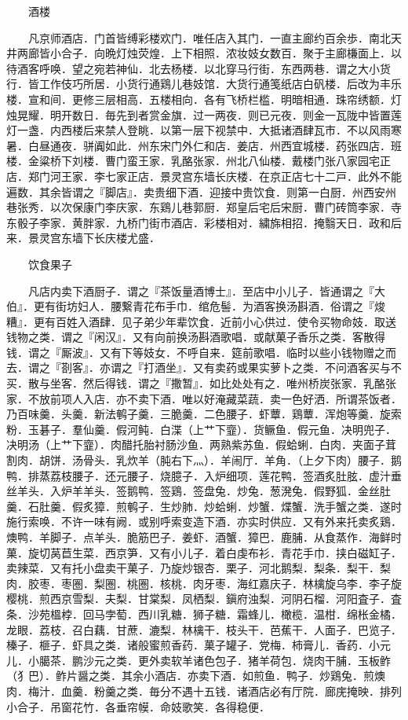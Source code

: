 　　酒楼

　　凡京师酒店．门首皆缚彩楼欢门．唯任店入其门．一直主廊约百余歩．南北天井两廊皆小合子．向晩灯烛荧煌．上下相照．浓妆妓女数百．聚于主廊槏面上．以待酒客呼唤．望之宛若神仙．北去杨楼．以北穿马行街．东西两巷．谓之大小货行．皆工作伎巧所居．小货行通鶏儿巷妓馆．大货行通笺纸店白矾楼．后改为丰乐楼．宣和间．更修三层相高．五楼相向．各有飞桥栏槛．明暗相通．珠帘绣额．灯烛晃耀．明开数日．毎先到者赏金旗．过一两夜．则已元夜．则金一瓦陇中皆置莲灯一盏．内西楼后来禁人登眺．以第一层下视禁中．大抵诸酒肆瓦市．不以风雨寒暑．白昼通夜．骈阗如此．州东宋门外仁和店．姜店．州西宜城楼．药张四店．班楼．金粱桥下刘楼．曹门蛮王家．乳酪张家．州北八仙楼．戴楼门张八家园宅正店．郑门河王家．李七家正店．景灵宫东墙长庆楼．在京正店七十二戸．此外不能遍数．其余皆谓之『脚店』．卖贵细下酒．迎接中贵饮食．则第一白厨．州西安州巷张秀．以次保康门李庆家．东鶏儿巷郭厨．郑皇后宅后宋厨．曹门砖筒李家．寺东骰子李家．黄胖家．九桥门街市酒店．彩楼相对．繍旆相招．掩翳天日．政和后来．景灵宫东墙下长庆楼尤盛．

　　饮食果子

　　凡店内卖下酒厨子．谓之『茶饭量酒博士』．至店中小儿子．皆通谓之『大伯』．更有街坊妇人．腰繋青花布手巾．绾危髻．为酒客换汤斟酒．俗谓之『焌糟』．更有百姓入酒肆．见子弟少年辈饮食．近前小心供过．使令买物命妓．取送钱物之类．谓之『闲汉』．又有向前换汤斟酒歌唱．或献菓子香乐之类．客散得钱．谓之『厮波』．又有下等妓女．不呼自来．筵前歌唱．临时以些小钱物赠之而去．谓之『剳客』．亦谓之『打酒坐』．又有卖药或果实萝卜之类．不问酒客买与不买．散与坐客．然后得钱．谓之『撒暂』．如比处处有之．唯州桥炭张家．乳酪张家．不放前项人入店．亦不卖下酒．唯以好淹藏菜蔬．卖一色好洒．所谓茶饭者．乃百味羹．头羹．新法鹌子羹．三脆羹．二色腰子．虾蕈．鶏蕈．浑炮等羹．旋索粉．玉碁子．羣仙羹．假河鲀．白渫（上艹下韲）．货鳜鱼．假元鱼．决明兜子．决明汤（上艹下韲）．肉醋托胎衬肠沙鱼．两熟紫苏鱼．假蛤蜊．白肉．夹面子茸割肉．胡饼．汤骨头．乳炊羊（肫右下灬）．羊闹厅．羊角．（上夕下肉）腰子．鹅鸭．排蒸荔枝腰子．还元腰子．烧臆子．入炉细项．莲花鸭．签酒炙肚胘．虚汁垂丝羊头．入炉羊羊头．签鹅鸭．签鶏．签盘兔．炒兔．葱溌兔．假野狐．金丝肚羹．石肚羹．假炙獐．煎鹌子．生炒肺．炒蛤蜊．炒蟹．煠蟹．洗手蟹之类．遂时施行索唤．不许一味有阙．或别呼索变造下酒．亦实时供应．又有外来托卖炙鶏．燠鸭．羊脚子．点羊头．脆筋巴子．姜虾．酒蟹．獐巴．鹿脯．从食蒸作．海鲜时菓．旋切莴苣生菜．西京笋．又有小儿子．着白虔布衫．青花手巾．挟白磁缸子．卖辣菜．又有托小盘卖干菓子．乃旋炒银杏．栗子．河北鹅梨．梨条．梨干．梨肉．胶枣．枣圏．梨圏．桃圏．核桃．肉牙枣．海红嘉庆子．林檎旋乌李．李子旋樱桃．煎西京雪梨．夫梨．甘棠梨．凤栖梨．鎭府浊梨．河阴石榴．河阳査子．査条．沙苑榲桲．回马孛萄．西川乳糖．狮子糖．霜蜂儿．橄榄．温柑．绵枨金橘．龙眼．荔枝．召白藕．甘蔗．漉梨．林檎干．枝头干．芭蕉干．人面子．巴览子．榛子．榧子．虾具之类．诸般蜜煎香药．菓子罐子．党梅．柿膏儿．香药．小元儿．小臈茶．鹏沙元之类．更外卖软羊诸色包子．猪羊荷包．烧肉干脯．玉板鲊（犭巴）．鲊片醤之类．其余小酒店．亦卖下酒．如煎鱼．鸭子．炒鶏兔．煎燠肉．梅汁．血羹．粉羹之类．毎分不遇十五钱．诸酒店必有厅院．廊庑掩映．排列小合子．吊窗花竹．各垂帘幙．命妓歌笑．各得稳便．

